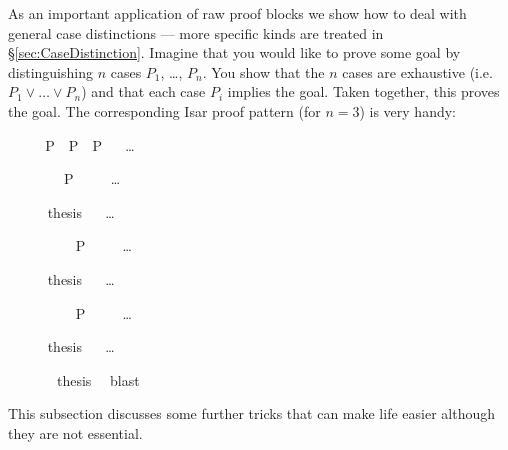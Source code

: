 \begin{isabellebody}
\begin{isamarkuptext}
As an important application of raw proof blocks we show how to deal
with general case distinctions --- more specific kinds are treated in
\S\ref{sec:CaseDistinction}. Imagine that you would like to prove some
goal by distinguishing $n$ cases $P_1$, \dots, $P_n$. You show that
the $n$ cases are exhaustive (i.e.\ $P_1 \lor \dots \lor P_n$) and
that each case $P_i$ implies the goal. Taken together, this proves the
goal. The corresponding Isar proof pattern (for $n = 3$) is very handy:%
\end{isamarkuptext}%
\isamarkuptrue%
%
\renewcommand{\isamarkupcmt}[1]{#1}
\isamarkupfalse%
\ {\isacharminus}\isanewline
\ \ \isamarkupfalse%
\ {\isachardoublequote}P\ {\isasymor}\ P\ {\isasymor}\ P\ \isamarkupfalse%
\ %
\isamarkupcmt{\dots%
}
\isanewline
\ \ \isamarkupfalse%
\isanewline
\ \ \isamarkupfalse%
\isacommand{{\isacharbraceleft}}\ \isamarkupfalse%
\ P\isanewline
\ \ \ \ %
\isamarkupcmt{\dots%
}
\isanewline
\ \ \ \ \isamarkupfalse%
\ {\isacharquery}thesis\ \isamarkupfalse%
\ %
\isamarkupcmt{\dots%
}
\ \isamarkupfalse%
\isacommand{{\isacharbraceright}}\isanewline
\ \ \isamarkupfalse%
\isanewline
\ \ \isamarkupfalse%
\isacommand{{\isacharbraceleft}}\ \isamarkupfalse%
\ P\isanewline
\ \ \ \ %
\isamarkupcmt{\dots%
}
\isanewline
\ \ \ \ \isamarkupfalse%
\ {\isacharquery}thesis\ \isamarkupfalse%
\ %
\isamarkupcmt{\dots%
}
\ \isamarkupfalse%
\isacommand{{\isacharbraceright}}\isanewline
\ \ \isamarkupfalse%
\isanewline
\ \ \isamarkupfalse%
\isacommand{{\isacharbraceleft}}\ \isamarkupfalse%
\ P\isanewline
\ \ \ \ %
\isamarkupcmt{\dots%
}
\isanewline
\ \ \ \ \isamarkupfalse%
\ {\isacharquery}thesis\ \isamarkupfalse%
\ %
\isamarkupcmt{\dots%
}
\ \isamarkupfalse%
\isacommand{{\isacharbraceright}}\isanewline
\ \ \isamarkupfalse%
\ \isamarkupfalse%
\ {\isacharquery}thesis\ \isamarkupfalse%
\ blast\isanewline
\isamarkupfalse%
\isamarkupfalse%
%
\renewcommand{\isamarkupcmt}[1]{{\isastylecmt--- #1}}
%
\isamarkuptrue%
%
\begin{isamarkuptext}%
This subsection discusses some further tricks that can make
life easier although they are not essential.%

\end{isamarkuptext}
\end{isabellebody}
